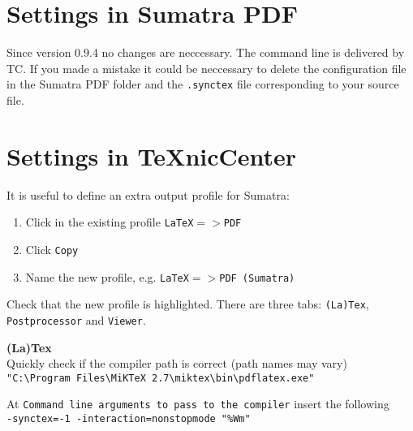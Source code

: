 \documentclass[parskip=half-]{scrartcl}
\begin{document}
\section{Settings in Sumatra PDF}
Since version 0.9.4 no changes are neccessary. The command line is delivered by TC. If you made a mistake it could be neccessary to delete the configuration file in the Sumatra PDF folder and the \texttt{.synctex} file corresponding to your source file.



\section{Settings in TeXnicCenter}
It is useful to define an extra output profile for Sumatra:


\begin{enumerate}
	\item Click in the existing profile \texttt{LaTeX$=>$PDF} 
	\item Click \texttt{Copy}
	\item Name the new profile, e.g. \texttt{LaTeX$=>$PDF (Sumatra)}
\end{enumerate}

Check that the new profile is highlighted. There are three tabs: \texttt{(La)Tex}, \texttt{Postprocessor} and \texttt{Viewer}.

\textbf{(La)Tex}\\
Quickly check if the compiler path is correct (path names may vary)\\
\verb+"C:\Program Files\MiKTeX 2.7\miktex\bin\pdflatex.exe"+

At \texttt{Command line arguments to pass to the compiler} insert the following\\
\verb+-synctex=-1 -interaction=nonstopmode "%Wm"+
\end{document}
